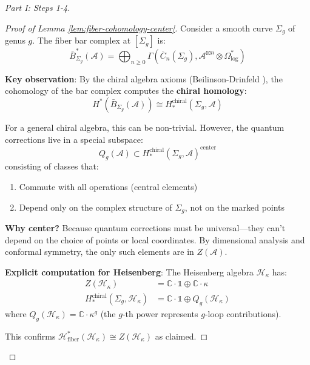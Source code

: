 \begin{proof}[Part I: Steps 1-4]
\begin{proof}[Proof of Lemma \ref{lem:fiber-cohomology-center}]
Consider a smooth curve $\Sigma_g$ of genus $g$. The fiber bar complex at $[\Sigma_g]$ 
is:
\begin{equation}
\bar{B}^*_{\Sigma_g}(\mathcal{A}) = \bigoplus_{n \geq 0} \Gamma(\overline{C}_n(
\Sigma_g), \mathcal{A}^{\boxtimes n} \otimes \Omega^*_{\log})
\end{equation}

\textbf{Key observation}: By the chiral algebra axioms (Beilinson-Drinfeld \cite[
Theorem 3.7.4]{BD04}), the cohomology of the bar complex computes the \textbf{chiral 
homology}:
\begin{equation}
H^*(\bar{B}_{\Sigma_g}(\mathcal{A})) \cong H^{\text{chiral}}_*(\Sigma_g, \mathcal{A})
\end{equation}

For a general chiral algebra, this can be non-trivial. However, the quantum corrections 
live in a special subspace:
\begin{equation}
Q_g(\mathcal{A}) \subset H^{\text{chiral}}_*(\Sigma_g, \mathcal{A})^{\text{center}}
\end{equation}
consisting of classes that:
\begin{enumerate}
\item Commute with all operations (central elements)
\item Depend only on the complex structure of $\Sigma_g$, not on the marked points
\end{enumerate}

\textbf{Why center?} Because quantum corrections must be universal---they can't depend 
on the choice of points or local coordinates. By dimensional analysis and conformal 
symmetry, the only such elements are in $Z(\mathcal{A})$.

\textbf{Explicit computation for Heisenberg}: The Heisenberg algebra $\mathcal{H}_\kappa$ 
has:
\begin{align}
Z(\mathcal{H}_\kappa) &= \mathbb{C} \cdot \mathbb{1} \oplus \mathbb{C} \cdot \kappa\\
H^{\text{chiral}}_*(\Sigma_g, \mathcal{H}_\kappa) &= \mathbb{C} \cdot \mathbb{1} 
\oplus Q_g(\mathcal{H}_\kappa)
\end{align}
where $Q_g(\mathcal{H}_\kappa) = \mathbb{C} \cdot \kappa^g$ (the $g$-th power represents 
$g$-loop contributions).

This confirms $\mathcal{H}^*_{\text{fiber}}(\mathcal{H}
_\kappa) \cong Z(\mathcal{H}
_\kappa)$ as claimed.
\end{proof}


\end{proof}
